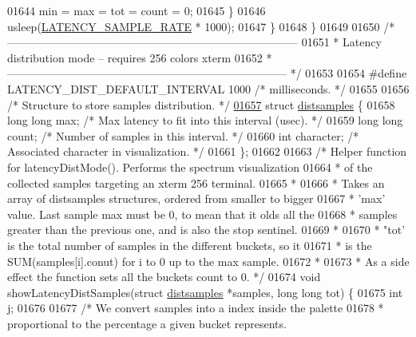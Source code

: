 \begin{DoxyCode}
{{{{{{{{{{{{{{{{{{{{{{{{{{{{{{{{{{{{{{{{{{{{01644             min = max = tot = count = 0;
01645         \}
01646         usleep(\hyperlink{redis-cli_8c_a76987a88882cfc750afde2c219a0bbab}{LATENCY\_SAMPLE\_RATE} * 1000);
01647     \}
01648 \}
01649 
01650 \textcolor{comment}{/*------------------------------------------------------------------------------}
01651 \textcolor{comment}{ * Latency distribution mode -- requires 256 colors xterm}
01652 \textcolor{comment}{ *--------------------------------------------------------------------------- */}
01653 
01654 \textcolor{preprocessor}{#}\textcolor{preprocessor}{define} \textcolor{preprocessor}{LATENCY\_DIST\_DEFAULT\_INTERVAL} 1000 \textcolor{comment}{/* milliseconds. */}
01655 
01656 \textcolor{comment}{/* Structure to store samples distribution. */}
\hyperlink{structdistsamples}{01657} \textcolor{keyword}{struct} \hyperlink{structdistsamples}{distsamples} \{
01658     \textcolor{keywordtype}{long} \textcolor{keywordtype}{long} max;   \textcolor{comment}{/* Max latency to fit into this interval (usec). */}
01659     \textcolor{keywordtype}{long} \textcolor{keywordtype}{long} count; \textcolor{comment}{/* Number of samples in this interval. */}
01660     \textcolor{keywordtype}{int} character;   \textcolor{comment}{/* Associated character in visualization. */}
01661 \};
01662 
01663 \textcolor{comment}{/* Helper function for latencyDistMode(). Performs the spectrum visualization}
01664 \textcolor{comment}{ * of the collected samples targeting an xterm 256 terminal.}
01665 \textcolor{comment}{ *}
01666 \textcolor{comment}{ * Takes an array of distsamples structures, ordered from smaller to bigger}
01667 \textcolor{comment}{ * 'max' value. Last sample max must be 0, to mean that it olds all the}
01668 \textcolor{comment}{ * samples greater than the previous one, and is also the stop sentinel.}
01669 \textcolor{comment}{ *}
01670 \textcolor{comment}{ * "tot' is the total number of samples in the different buckets, so it}
01671 \textcolor{comment}{ * is the SUM(samples[i].conut) for i to 0 up to the max sample.}
01672 \textcolor{comment}{ *}
01673 \textcolor{comment}{ * As a side effect the function sets all the buckets count to 0. */}
01674 \textcolor{keywordtype}{void} showLatencyDistSamples(\textcolor{keyword}{struct} \hyperlink{structdistsamples}{distsamples} *samples, \textcolor{keywordtype}{long} \textcolor{keywordtype}{long} tot) \{
01675     \textcolor{keywordtype}{int} j;
01676 
01677      \textcolor{comment}{/* We convert samples into a index inside the palette}
01678 \textcolor{comment}{     * proportional to the percentage a given bucket represents.}
}}}}}}}}}}}}}}}}}}}}}}}}}}}}}}}}}}}}}}}}}}}}
\end{DoxyCode}
